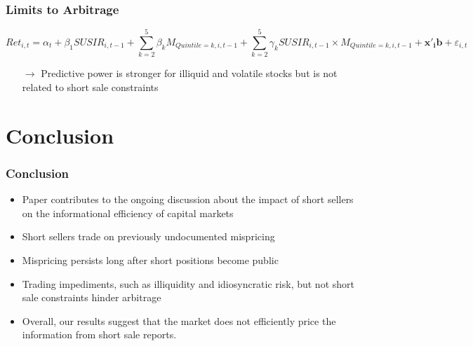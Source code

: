 \documentclass{beamer}
\begin{document}

	\begin{frame}
		\frametitle{Limits to Arbitrage}
		\vspace*{-0.6cm}
{\scriptsize
		\begin{equation} \nonumber
Ret_{i,t} = \alpha_t+\beta_1  SUSIR_{i,t-1} +   \sum_{k=2}^5 \beta_k M_{Quintile=k,i,t-1} + \sum_{k=2}^5 \gamma_k SUSIR_{i,t-1} \times  M_{Quintile=k,i,t-1}  + \mathbf{x'_{i}} \mathbf{b}+ \varepsilon_{i,t}
\end{equation}
}
		\vspace*{-0.5cm}
		\begin{table}[htbp]
	  \centering
	  \footnotesize
	       	  \resizebox{0.7\textwidth}{!}{
	 	
	\label{tab:limits_to_arbitrage}%
	}
\end{table}
\begin{itemize}
\item[$\rightarrow$] Predictive power is stronger for illiquid and volatile stocks but is not related to short sale constraints
\end{itemize}

\end{frame}

	
	\section{Conclusion}
	\begin{frame}
		\frametitle{Conclusion}
		\begin{itemize}
		\item Paper contributes to the ongoing discussion about the impact of short sellers on the informational efficiency of capital markets
		\item Short sellers trade on previously undocumented mispricing 
		\item Mispricing persists long after short positions become public
		\item Trading impediments, such as illiquidity and idiosyncratic risk, but not short sale constraints hinder arbitrage
		\item Overall, our results suggest that the market does not efficiently price the information from short sale reports.
		
		\end{itemize}
	\end{frame}  


\end{document}
